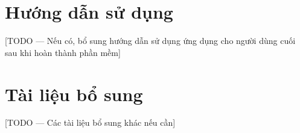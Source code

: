 \chapter{Hướng dẫn sử dụng}
\label{ch:appendix_user_guide}

[TODO --- Nếu có, bổ sung hướng dẫn sử dụng ứng dụng cho người dùng cuối sau khi hoàn thành phần mềm]


\chapter{Tài liệu bổ sung}
\label{ch:appendix_extra}

[TODO --- Các tài liệu bổ sung khác nếu cần]
